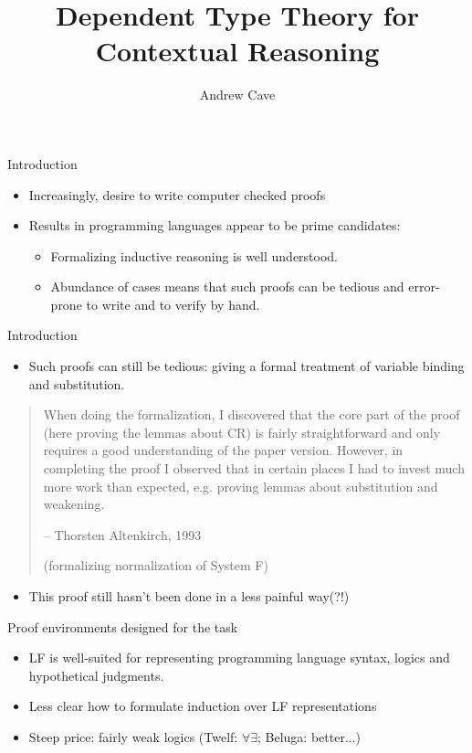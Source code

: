 \documentclass[usenames,dvipsnames]{beamer}
\author{Andrew Cave}
\title[{\makebox[.45\paperwidth]{Dependent Type Theory for Contextual Reasoning\hfill%
       \insertframenumber/\inserttotalframenumber}}]{Dependent Type Theory for Contextual Reasoning}
\begin{document}
\begin{frame}
\titlepage
\end{frame}

\begin{frame}{Introduction}
\begin{itemize}
\item Increasingly, desire to write computer checked proofs
\item Results in programming languages appear to be prime
candidates:
\begin{itemize}
\item Formalizing inductive reasoning is well understood.
\item Abundance of cases means that such proofs can be
tedious and error-prone to write and to verify by hand.
\end{itemize}
\end{itemize}
\end{frame}

\begin{frame}{Introduction}
\begin{itemize}
\item Such proofs can still be tedious: giving a formal treatment of variable binding and
substitution.
\end{itemize}
\begin{quote}
When doing the formalization, I discovered that the core part of the
proof (here proving the lemmas about CR) is fairly straightforward and
only requires a good understanding of the paper version. However, in
completing the proof I observed that in certain places I had to invest
much more work than expected, e.g. proving lemmas about substitution
and weakening.

-- Thorsten Altenkirch, 1993

   (formalizing normalization of System F)
\end{quote}
\pause
\begin{itemize}
\item This proof still hasn't been done in a less painful way(?!)
\end{itemize}
\end{frame}

\begin{frame}{Proof environments designed for the task}
\begin{itemize}
\item LF is well-suited for representing
programming language syntax, logics and hypothetical
judgments.
\item Less clear how to formulate induction
over LF representations
\item Steep price: fairly weak logics (Twelf: $\forall\exists$; Beluga: better...)
\end{itemize}
\end{frame}
\end{document}
